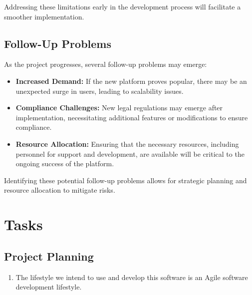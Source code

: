 \documentclass[12pt]{article}
\begin{document}
Addressing these limitations early in the development process will facilitate a smoother implementation.

\subsection{Follow-Up Problems}
As the project progresses, several follow-up problems may emerge:

\begin{itemize}
    \item \textbf{Increased Demand:} If the new platform proves popular, there may be an unexpected surge in users, leading to scalability issues.
    \item \textbf{Compliance Challenges:} New legal regulations may emerge after implementation, necessitating additional features or modifications to ensure compliance.
    \item \textbf{Resource Allocation:} Ensuring that the necessary resources, including personnel for support and development, are available will be critical to the ongoing success of the platform.
\end{itemize}

Identifying these potential follow-up problems allows for strategic planning and resource allocation to mitigate risks.


\section{Tasks}
\subsection{Project Planning}
\begin{enumerate}
  \item The lifestyle we intend to use and develop this software is an Agile software development lifestyle.
\end{enumerate}
\end{document}

